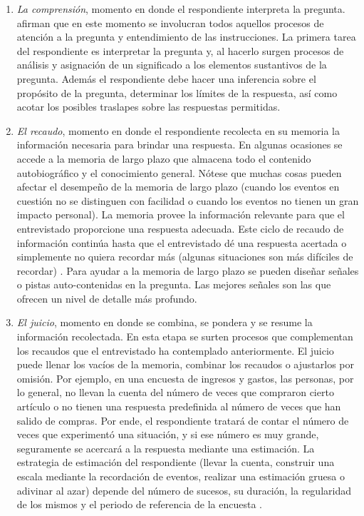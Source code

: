 \documentclass[
  12pt,
]{book}
\providecommand{\tightlist}{%
  \setlength{\itemsep}{0pt}\setlength{\parskip}{0pt}}
\begin{document}
\begin{enumerate}
\def\labelenumi{\arabic{enumi}.}
\tightlist
\item
  \emph{La comprensión}, momento en donde el respondiente interpreta la pregunta. \citet{Groves_Fowler_Couper_Lepkowski_Singer_Tourangeau_2009} afirman que en este momento se involucran todos aquellos procesos de atención a la pregunta y entendimiento de las instrucciones. La primera tarea del respondiente es interpretar la pregunta y, al hacerlo surgen procesos de análisis y asignación de un significado a los elementos sustantivos de la pregunta. Además el respondiente debe hacer una inferencia sobre el propósito de la pregunta, determinar los límites de la respuesta, así como acotar los posibles traslapes sobre las respuestas permitidas.
\item
  \emph{El recaudo}, momento en donde el respondiente recolecta en su memoria la información necesaria para brindar una respuesta. En algunas ocasiones se accede a la memoria de largo plazo que almacena todo el contenido autobiográfico y el conocimiento general. Nótese que muchas cosas pueden afectar el desempeño de la memoria de largo plazo (cuando los eventos en cuestión no se distinguen con facilidad o cuando los eventos no tienen un gran impacto personal). La memoria provee la información relevante para que el entrevistado proporcione una respuesta adecuada. Este ciclo de recaudo de información continúa hasta que el entrevistado dé una respuesta acertada o simplemente no quiera recordar más (algunas situaciones son más difíciles de recordar) \citep{Groves_Fowler_Couper_Lepkowski_Singer_Tourangeau_2009}. Para ayudar a la memoria de largo plazo se pueden diseñar señales o pistas auto-contenidas en la pregunta. Las mejores señales son las que ofrecen un nivel de detalle más profundo.
\item
  \emph{El juicio}, momento en donde se combina, se pondera y se resume la información recolectada. En esta etapa se surten procesos que complementan los recaudos que el entrevistado ha contemplado anteriormente. El juicio puede llenar los vacíos de la memoria, combinar los recaudos o ajustarlos por omisión. Por ejemplo, en una encuesta de ingresos y gastos, las personas, por lo general, no llevan la cuenta del número de veces que compraron cierto artículo o no tienen una respuesta predefinida al número de veces que han salido de compras. Por ende, el respondiente tratará de contar el número de veces que experimentó una situación, y si ese número es muy grande, seguramente se acercará a la respuesta mediante una estimación. La estrategia de estimación del respondiente (llevar la cuenta, construir una escala mediante la recordación de eventos, realizar una estimación gruesa o adivinar al azar) depende del número de sucesos, su duración, la regularidad de los mismos y el periodo de referencia de la encuesta \citep{Groves_Fowler_Couper_Lepkowski_Singer_Tourangeau_2009}.

\end{enumerate}
\end{document}
